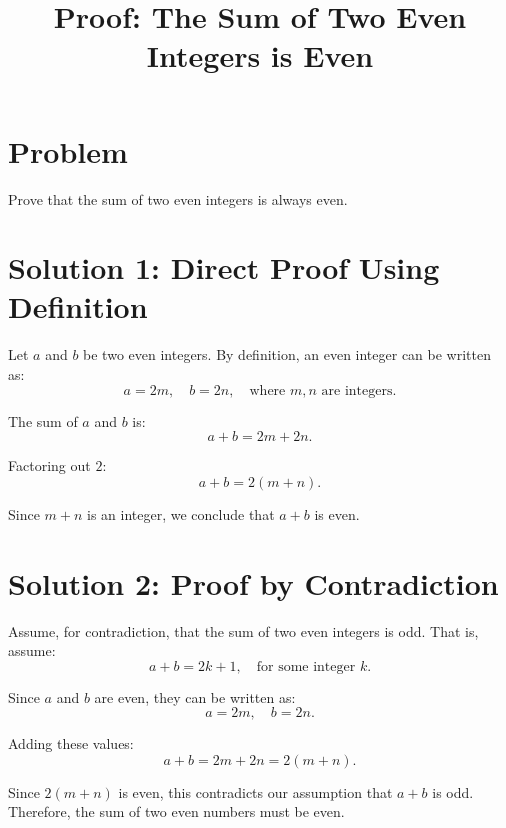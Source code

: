 \documentclass{article}
\begin{document}
\title{Proof: The Sum of Two Even Integers is Even}
\author{}
\date{}
\maketitle

\section*{Problem}
Prove that the sum of two even integers is always even.

\section*{Solution 1: Direct Proof Using Definition}
Let $a$ and $b$ be two even integers. By definition, an even integer can be written as:
\begin{equation}
    a = 2m, \quad b = 2n, \quad \text{where } m, n \text{ are integers}.
\end{equation}

The sum of $a$ and $b$ is:
\begin{equation}
    a + b = 2m + 2n.
\end{equation}

Factoring out $2$:
\begin{equation}
    a + b = 2(m + n).
\end{equation}

Since $m + n$ is an integer, we conclude that $a + b$ is even.

\section*{Solution 2: Proof by Contradiction}
Assume, for contradiction, that the sum of two even integers is odd. That is, assume:
\begin{equation}
    a + b = 2k + 1, \quad \text{for some integer } k.
\end{equation}

Since $a$ and $b$ are even, they can be written as:
\begin{equation}
    a = 2m, \quad b = 2n.
\end{equation}

Adding these values:
\begin{equation}
    a + b = 2m + 2n = 2(m+n).
\end{equation}

Since $2(m+n)$ is even, this contradicts our assumption that $a + b$ is odd. Therefore, the sum of two even numbers must be even.
\end{document}
